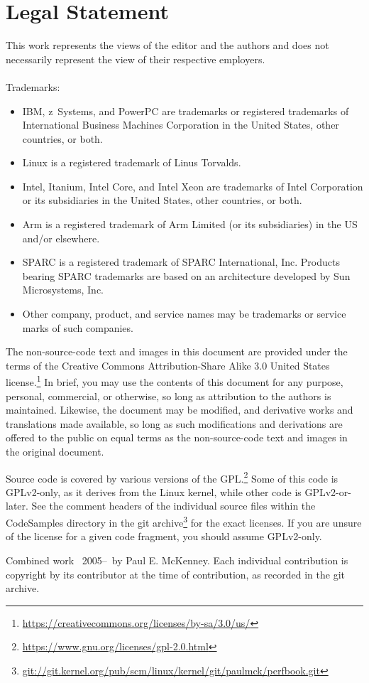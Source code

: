 
\section*{Legal Statement}

This work represents the views of the editor and the authors and does not
necessarily represent the view of their respective employers. \\
\\
Trademarks:
\begin{itemize}
\item	IBM, z~Systems, and PowerPC are trademarks or registered trademarks
	of International Business Machines Corporation in the United
	States, other countries, or both.
\item	Linux is a registered trademark of Linus Torvalds.
\item	Intel, Itanium, Intel Core, and Intel Xeon are trademarks
	of Intel Corporation or its subsidiaries in the United States,
	other countries, or both.
\item	Arm is a registered trademark of Arm Limited (or its subsidiaries)
	in the US and/or elsewhere.
\item	SPARC is a registered trademark of SPARC International, Inc.
	Products bearing SPARC trademarks are based on an architecture
	developed by Sun Microsystems, Inc.
\item	Other company, product, and service names may be trademarks or
	service marks of such companies.
\end{itemize}

The non-source-code text and images in this document are provided under
the terms of the Creative Commons Attribution-Share Alike 3.0 United
States license.\footnote{
	\url{https://creativecommons.org/licenses/by-sa/3.0/us/}}
In brief, you may use the contents of this document for any purpose,
personal, commercial, or otherwise, so long as attribution to the
authors is maintained.  Likewise, the document may be modified,
and derivative works and translations made available, so long as
such modifications and derivations are offered to the public on equal
terms as the non-source-code text and images in the original document.

Source code is covered by various versions of the GPL.\footnote{
	\url{https://www.gnu.org/licenses/gpl-2.0.html}}
Some of this code is GPLv2-only, as it derives from the Linux kernel,
while other code is GPLv2-or-later.
See the comment headers of the individual source files within the
CodeSamples directory in the git archive\footnote{
	\url{git://git.kernel.org/pub/scm/linux/kernel/git/paulmck/perfbook.git}}
for the exact licenses.
If you are unsure of the license for a given code fragment,
you should assume GPLv2-only.

Combined work {\textcopyright}~2005--\commityear\ by Paul E. McKenney.
Each individual contribution is copyright by its contributor at the time
of contribution, as recorded in the git archive.
